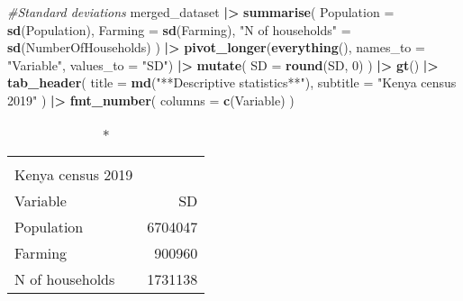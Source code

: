 \documentclass[
]{article}
\newenvironment{Shaded}{\begin{snugshade}}{\end{snugshade}}
\newcommand{\AttributeTok}[1]{\textcolor[rgb]{0.13,0.29,0.53}{#1}}
\newcommand{\CommentTok}[1]{\textcolor[rgb]{0.56,0.35,0.01}{\textit{#1}}}
\newcommand{\DecValTok}[1]{\textcolor[rgb]{0.00,0.00,0.81}{#1}}
\newcommand{\FunctionTok}[1]{\textcolor[rgb]{0.13,0.29,0.53}{\textbf{#1}}}
\newcommand{\NormalTok}[1]{#1}
\newcommand{\OtherTok}[1]{\textcolor[rgb]{0.56,0.35,0.01}{#1}}
\newcommand{\SpecialCharTok}[1]{\textcolor[rgb]{0.81,0.36,0.00}{\textbf{#1}}}
\newcommand{\StringTok}[1]{\textcolor[rgb]{0.31,0.60,0.02}{#1}}
\begin{document}
\begin{Shaded}
\begin{Highlighting}[]
\CommentTok{\#Standard deviations}
\NormalTok{merged\_dataset }\SpecialCharTok{|\textgreater{}} 
  \FunctionTok{summarise}\NormalTok{(}
    \AttributeTok{Population =} \FunctionTok{sd}\NormalTok{(Population),}
    \AttributeTok{Farming =} \FunctionTok{sd}\NormalTok{(Farming),}
    \StringTok{"N of households"} \OtherTok{=} \FunctionTok{sd}\NormalTok{(NumberOfHouseholds)}
\NormalTok{  ) }\SpecialCharTok{|\textgreater{}} 
  \FunctionTok{pivot\_longer}\NormalTok{(}\FunctionTok{everything}\NormalTok{(), }\AttributeTok{names\_to =} \StringTok{"Variable"}\NormalTok{, }\AttributeTok{values\_to =} \StringTok{"SD"}\NormalTok{) }\SpecialCharTok{|\textgreater{}} 
  \FunctionTok{mutate}\NormalTok{(}
    \AttributeTok{SD =} \FunctionTok{round}\NormalTok{(SD, }\DecValTok{0}\NormalTok{)}
\NormalTok{  ) }\SpecialCharTok{|\textgreater{}}
  \FunctionTok{gt}\NormalTok{() }\SpecialCharTok{|\textgreater{}} 
  \FunctionTok{tab\_header}\NormalTok{(}
    \AttributeTok{title =} \FunctionTok{md}\NormalTok{(}\StringTok{"**Descriptive statistics**"}\NormalTok{),}
    \AttributeTok{subtitle =} \StringTok{"Kenya census 2019"}
\NormalTok{  ) }\SpecialCharTok{|\textgreater{}} 
  \FunctionTok{fmt\_number}\NormalTok{(}
    \AttributeTok{columns =} \FunctionTok{c}\NormalTok{(Variable)}
\NormalTok{  )}
\end{Highlighting}
\end{Shaded}

\begin{longtable}{lr}
\caption*{
{\large \textbf{Descriptive statistics}} \\ 
{\small Kenya census 2019}
} \\ 
\toprule
Variable & SD \\ 
\midrule\addlinespace[2.5pt]
Population & 6704047 \\ 
Farming & 900960 \\ 
N of households & 1731138 \\ 
\bottomrule
\end{longtable}
\end{document}

